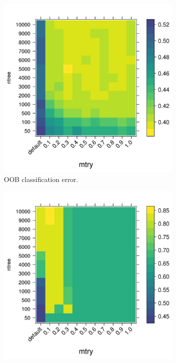 \documentclass[10pt,letterpaper]{article}
\begin{document}
\begin{figure}[tbhp] 
  \begin{adjustwidth}{-1.00in}{0in}
    \caption{\textbf{Out of bag classification error and rank-biased-overlap estimates}} 
    \label{figure:synth1}
    \begin{subfigure}[b]{0.5\linewidth}
      \centering
      \includegraphics[totalheight=8cm]{./figs/oob_levleplot.png}
      \caption{OOB classification error.} 
      \label{figure:out-of-bag-prediction-error-prod.png} 
    \end{subfigure} 
    \begin{subfigure}[b]{0.5\linewidth}
      \centering
      \includegraphics[totalheight=8cm]{./figs/rbo_levleplot.png}

\end{subfigure}
\end{adjustwidth}
\end{figure}
\end{document}
